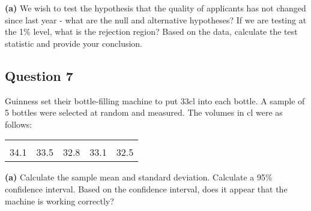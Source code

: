 \documentclass[12pt]{article}
\begin{document}
{\bf(a)} We wish to test the hypothesis that the quality of applicants has not changed since last year - what are the null and alternative hypotheses?  If we are testing at the 1\% level, what is the rejection region?  Based on the data, calculate the test statistic and provide your conclusion.





\subsection*{Question 7}
Guinness set their bottle-filling machine to put 33cl into each bottle. A sample of 5 bottles were selected at random and measured. The volumes in cl were as follows:\\[-0.2cm]
\begin{center}
	\begin{tabular}{|ccccc|}
		\hline
		&&&&\\[-0.3cm]
		34.1  & 33.5 & 32.8 & 33.1 & 32.5\\[0.1cm]
		\hline
	\end{tabular}
\end{center}


{\bf(a)} Calculate the sample mean and standard deviation.  Calculate a 95\% confidence interval.   Based on the confidence interval, does it appear that the machine is working correctly?












\end{document}

